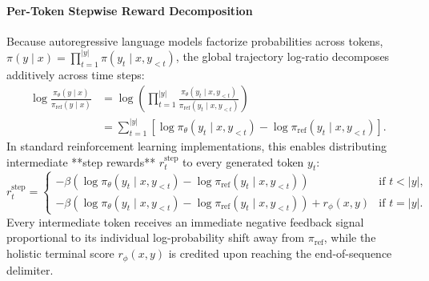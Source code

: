 \documentclass[../../main.tex]{subfiles}
\begin{document}
\paragraph{Per-Token Stepwise Reward Decomposition}
Because autoregressive language models factorize probabilities across tokens, $\pi(y \mid x) = \prod_{t=1}^{|y|} \pi(y_t \mid x, y_{<t})$, the global trajectory log-ratio decomposes additively across time steps:
\begin{align}
\log \frac{\pi_\theta(y \mid x)}{\pi_{\text{ref}}(y \mid x)} &= \log \left( \prod_{t=1}^{|y|} \frac{\pi_\theta(y_t \mid x, y_{<t})}{\pi_{\text{ref}}(y_t \mid x, y_{<t})} \right) \nonumber \\
&= \sum_{t=1}^{|y|} \left[ \log \pi_\theta(y_t \mid x, y_{<t}) - \log \pi_{\text{ref}}(y_t \mid x, y_{<t}) \right].
\end{align}
In standard reinforcement learning implementations, this enables distributing intermediate **step rewards** $r_t^{\text{step}}$ to every generated token $y_t$:
\begin{equation}
\label{eq:step_reward_formulation}
r_t^{\text{step}} = \begin{cases}
-\beta \left( \log \pi_\theta(y_t \mid x, y_{<t}) - \log \pi_{\text{ref}}(y_t \mid x, y_{<t}) \right) & \text{if } t < |y|, \\
-\beta \left( \log \pi_\theta(y_t \mid x, y_{<t}) - \log \pi_{\text{ref}}(y_t \mid x, y_{<t}) \right) + r_\phi(x, y) & \text{if } t = |y|.
\end{cases}
\end{equation}
Every intermediate token receives an immediate negative feedback signal proportional to its individual log-probability shift away from $\pi_{\text{ref}}$, while the holistic terminal score $r_\phi(x, y)$ is credited upon reaching the end-of-sequence delimiter.
\end{document}
